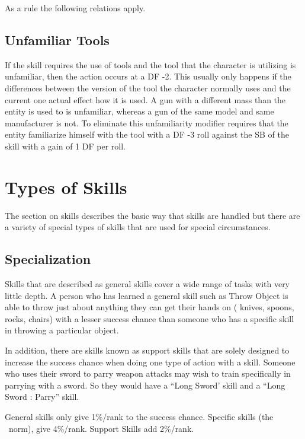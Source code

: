 As a rule the following relations apply.



\subsection{Unfamiliar Tools}

If the skill requires the use of tools and the tool that the character is
utilizing is unfamiliar, then the action occurs at a DF -2. This usually
only happens if the differences between the version of the tool the
character normally uses and the current one actual effect how it is
used. A gun with a different mass than the entity is used to is
unfamiliar, whereas a gun of the same model and same manufacturer is
not. To eliminate this unfamiliarity modifier requires that the entity
familiarize himself with the tool with a DF -3 roll against the SB of 
the skill with a gain of 1 DF per roll. 

\section{Types of Skills}

The section on skills describes the basic way that skills are 
handled but there are a variety of special types of skills that are 
used for special circumstances.

\subsection{Specialization}

Skills that are described as general skills cover a wide range of 
tasks with very little depth. A person who has learned a general 
skill such as Throw Object is able to throw just about anything they 
can get their hands on ( knives, spoons, rocks, chairs) with a lesser 
success chance than someone who has a specific skill in throwing a
particular object.

In addition, there are skills known as support skills that are solely 
designed to increase the success chance when doing one type of action 
with a skill. Someone who uses their sword to parry weapon attacks 
may wish to train specifically in parrying with a sword. So they 
would have a ``Long Sword' skill and a ``Long Sword : Parry'' skill.


General skills only give 1\%/rank to the success chance. Specific 
skills (the \SH\ norm), give 4\%/rank. Support Skills add 2\%/rank.

